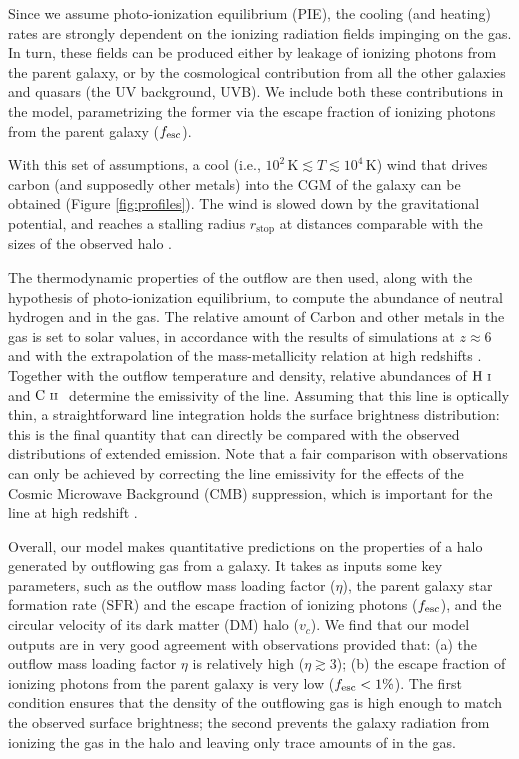 \documentclass[a4paper, 12pt]{article}
\begin{document}
Since we assume photo-ionization equilibrium (PIE), the cooling (and heating) rates are strongly dependent on the ionizing radiation fields impinging on the gas. In turn, these fields can be produced either by leakage of ionizing photons from the parent galaxy, or by the cosmological contribution from all the other galaxies and quasars (the UV background, UVB). We include both these contributions in the model, parametrizing the former via the escape fraction of ionizing photons from the parent galaxy ($f_{\rm esc}$).


With this set of assumptions, a cool (i.e., $10^2\,\mathrm{K}\lesssim T \lesssim 10^4\,\mathrm{K}$) wind that drives carbon (and supposedly other metals) into the CGM of the galaxy can be obtained (Figure \ref{fig:profiles}). The wind is slowed down by the gravitational potential, and reaches a stalling radius $r_\mathrm{stop}$ at distances comparable with the sizes of the observed \CII halo \citep[][]{Fujimoto19}. 


The thermodynamic properties of the outflow are then used, along with the hypothesis of photo-ionization equilibrium, to compute the abundance of neutral hydrogen and \CIIion in the gas. The relative amount of Carbon and other metals in the gas is set to solar values, in accordance with the results of simulations at $z\approx6$ \citep{pallottini2017, pallottini:2019} and with the extrapolation of the mass-metallicity relation at high redshifts \citep{mannucci:2012}. Together with the outflow temperature and density, relative abundances of $\hbox{H~$\scriptstyle\rm I\ $}$ and $\hbox{C~$\scriptstyle\rm II $~}$ determine the emissivity of the \CII line. Assuming that this line is optically thin, a straightforward line integration holds the \CII surface brightness distribution: this is the final quantity that can directly be compared with the observed distributions of \CII extended emission. Note that a fair comparison with observations can only be achieved by correcting the \CII line emissivity for the effects of the Cosmic Microwave Background (CMB) suppression, which is important for the \CII line at high redshift \cite{gong2012, dacunha2013, vallini2015, kohandel:2019}.

Overall, our model makes quantitative predictions on the properties of a \CII halo generated by outflowing gas from a galaxy. It takes as inputs some key parameters, such as the outflow mass loading factor ($\eta$), the parent galaxy star formation rate ($\mathrm{SFR}$) and the escape fraction of ionizing photons ($f_{\rm esc}$), and the circular velocity of its dark matter (DM) halo ($v_c$). We find that our model outputs are in very good agreement with observations \citep{Fujimoto19, Fujimoto:2020qzo} provided that: (a) the outflow mass loading factor $\eta$ is relatively high ($\eta \gtrsim 3$); (b) the escape fraction of ionizing photons from the parent galaxy is very low ($f_{\rm esc} < 1\%$). The first condition ensures that the density of the outflowing gas is high enough to match the observed \CII surface brightness; the second prevents the galaxy radiation from ionizing the gas in the halo and leaving only trace amounts of \CIIion in the gas. 
\end{document}
